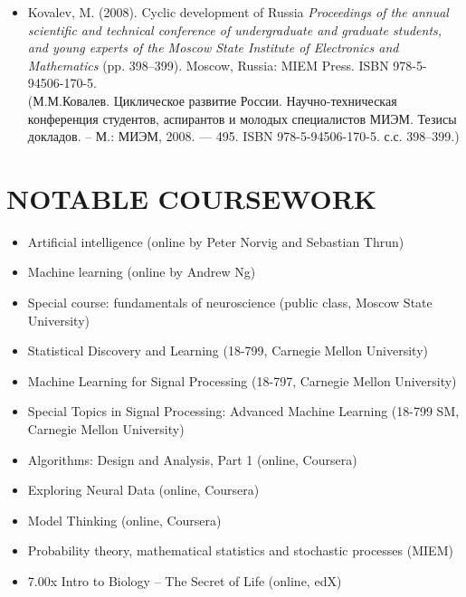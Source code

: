 \documentclass{res}
\begin{document}
\begin{resume}
\begin{itemize}
		Kovalev, M. (2011). Positioning of the surface transport vehicles by means of GSM signal. \emph{Proceedings of the annual scientific and technical conference of undergraduate and graduate students, and young experts of the Moscow State Institute of Electronics and Mathematics} (pp. 29--30). Moscow, Russia: MIEM Press. ISBN 978-5-94506-257-3.\\
		(М.М.Ковалев. Позиционирование наземного транспорта с помощью сигнала GSM. Научно-техническая конференция студентов, аспирантов и молодых специалистов МИЭМ. Тезисы докладов. -- М.: МИЭМ, 2011. --- 420. ISBN 978-5-94506-257-3. с.с. 29--30.)
	\item
		Kovalev, M. (2008). Cyclic development of Russia \emph{Proceedings of the annual scientific and technical conference of undergraduate and graduate students, and young experts of the Moscow State Institute of Electronics and Mathematics} (pp. 398--399). Moscow, Russia: MIEM Press. ISBN 978-5-94506-170-5.\\
		(М.М.Ковалев. Циклическое развитие России. Научно-техническая конференция студентов, аспирантов и молодых специалистов МИЭМ. Тезисы докладов. -- М.: МИЭМ, 2008. --- 495. ISBN 978-5-94506-170-5. с.с. 398--399.)
\end{itemize}

\section{NOTABLE COURSEWORK}          
 
\begin{itemize}
	\item
		Artificial intelligence (online by Peter Norvig and Sebastian Thrun)
	\item
		Machine learning (online by Andrew Ng)
	\item
		Special course: fundamentals of neuroscience (public class, Moscow State University)
	\item
		Statistical Discovery and Learning (18-799, Carnegie Mellon University)
	\item
		Machine Learning for Signal Processing (18-797, Carnegie Mellon University)
	\item
		Special Topics in Signal Processing: Advanced Machine Learning (18-799 SM, Carnegie Mellon University)
	\item
		Algorithms: Design and Analysis, Part 1 (online, Coursera)
	\item
		Exploring Neural Data (online, Coursera)
	\item
		Model Thinking (online, Coursera)
	\item
		Probability theory, mathematical statistics and stochastic processes  (MIEM)
	\item
		7.00x Intro to Biology -- The Secret of Life (online, edX)
\end{itemize}


\end{resume}
\end{document}
